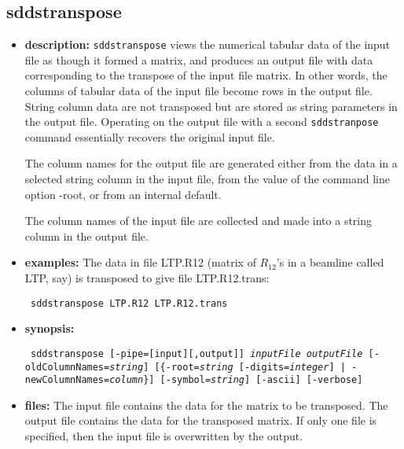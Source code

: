 %
\newpage

%
%
\subsection{sddstranspose}
\label{sddstranspose}

\begin{itemize}
\item {\bf description:}
%
%
\verb+sddstranspose+ views the numerical tabular data of the input file
as though it formed a matrix, and produces an output
file with data corresponding to the transpose of the input
file matrix. In other words, the columns of tabular data of the input
file become rows in the output file. String column data
are not transposed but are stored as string parameters in the output file.
Operating on the output file with a second \verb+sddstranpose+ command essentially recovers
the original input file.

The column names for the output file are generated either from the data in
a selected string column in the input file,
from the value of the command line option -root,
or from an internal default.

The column names of the input file are collected and made into
a string column in the output file.

\item {\bf examples:} 
%
% 
%
The data in file LTP.R12 (matrix of $R_{12}$'s in a beamline called LTP, say)
is transposed to give file LTP.R12.trans:
\begin{flushleft}{\tt
sddstranspose LTP.R12 LTP.R12.trans
}\end{flushleft}
\item {\bf synopsis:} 
%
%
\begin{flushleft}{\tt
sddstranspose [-pipe=[input][,output]] {\em inputFile} {\em outputFile}
     [-oldColumnNames={\em string}] [\{-root={\em string} [-digits={\em integer}] | 
     -newColumnNames={\em column}\}] 
     [-symbol={\em string}] [-ascii] [-verbose]
}\end{flushleft}
\item {\bf files:}
The input file contains the data for the matrix to be transposed. The output file
contains the data for the transposed matrix. If only one file is specified,
then the input file is overwritten by the output.



\end{itemize}
